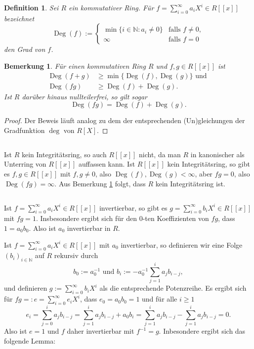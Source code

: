 \documentclass[a4paper,10pt]{article}
\newcounter{satze}
\newtheorem{bem}[satze]{Bemerkung}
\newtheorem*{defi}{Definition}
\theoremstyle{definition}
\newcommand{\N}{\mathbb{N}}
\newcommand{\Deg}{\operatorname{Deg}}
\begin{document}
\begin{defi}
Sei $R$ ein kommutativer Ring. Für $f = \sum_{i=0}^\infty a_i X^i \in R[\![x]\!]$ bezeichnet
\[
 \Deg(f) :=
 \begin{cases}
  \min \{i \in \N : a_i \neq 0\} & \text{falls } f \neq 0, \\
                          \infty & \text{falls } f = 0
 \end{cases}
\]
den \emph{Grad} von $f$.
\end{defi}
\begin{bem}\label{bem: grad potenzreihe}
 Für einen kommutativen Ring $R$ und $f,g \in R[\![x]\!]$ ist
 \begin{align*}
  \Deg(f+g) &\geq \min \{\Deg(f), \Deg(g)\} \text{ und } \\
  \Deg(fg)  &\geq \Deg(f) + \Deg(g).
 \end{align*}
 Ist $R$ darüber hinaus nullteilerfrei, so gilt sogar
 \begin{equation*}
  \Deg(fg) = \Deg(f) + \Deg(g).
 \end{equation*}
\end{bem}
\begin{proof}
 Der Beweis läuft analog zu dem der entsprechenden (Un)gleichungen der Gradfunktion $\deg$ von $R[X]$.
\end{proof}



\subsection{}
Ist $R$ kein Integritätsring, so auch $R[\![x]\!]$ nicht, da man $R$ in kanonischer als Unterring von $R[\![x]\!]$ auffassen kann. Ist $R[\![x]\!]$ kein Integritätsring, so gibt es $f, g \in R[\![x]\!]$ mit $f,g \neq 0$, also $\Deg(f), \Deg(g) < \infty$, aber $fg = 0$, also $\Deg(fg) = \infty$. Aus Bemerkung \ref{bem: grad potenzreihe} folgt, dass $R$ kein Integritätsring ist.


\subsection{}
Ist $f = \sum_{i=0}^\infty a_i X^i \in R[\![x]\!]$ invertierbar, so gibt es $g = \sum_{i=0}^\infty b_i X^i \in R[\![x]\!]$ mit $fg = 1$. Insbesondere ergibt sich für den $0$-ten Koeffizienten von $fg$, dass $1 = a_0 b_0$. Also ist $a_0$ invertierbar in $R$.

Ist $f = \sum_{i=0}^\infty a_i X^i \in R[\![x]\!]$ mit $a_0$ invertierbar, so definieren wir eine Folge $(b_i)_{i \in \N}$ auf $R$ rekursiv durch
\[
 b_0 := a_0^{-1} \text{ und } b_i := -a_0^{-1} \sum_{j=1}^i a_j b_{i-j},
\]
und definieren $g := \sum_{i=0}^\infty b_i X^i$ als die entsprechende Potenzreihe. Es ergibt sich für \mbox{$fg =: e = \sum_{i=0}^\infty e_i X^i$}, dass $e_0 = a_0 b_0 = 1$ und für alle $i \geq 1$
\[
 e_i
 = \sum_{j=0}^i a_j b_{i-j}
 = \sum_{j=1}^i a_j b_{i-j} + a_0 b_i
 = \sum_{j=1}^i a_j b_{i-j} - \sum_{j=1}^i a_j b_{i-j}
 = 0.
\]
Also ist $e = 1$ und $f$ daher invertierbar mit $f^{-1} = g$. Inbesondere ergibt sich das folgende Lemma:
\end{document}
